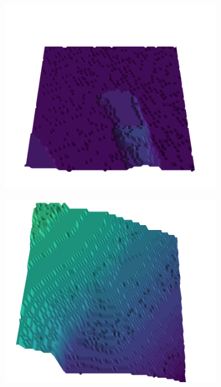 \documentclass[../document.tex]{subfiles}
\begin{document}
\begin{figure}[H]
    \begin{subfigure}[b]{0.19\textwidth}
        \includegraphics[width=\linewidth]{../img/5/quarry/false_negative//patch-3d-majavi-colormap-2.png}
    \end{subfigure}
    \begin{subfigure}[b]{0.19\textwidth}
        \includegraphics[width=\linewidth]{../img/5/quarry/false_negative//patch-3d-majavi-colormap-3.png}
    \end{subfigure}  

\end{figure}
\end{document}
